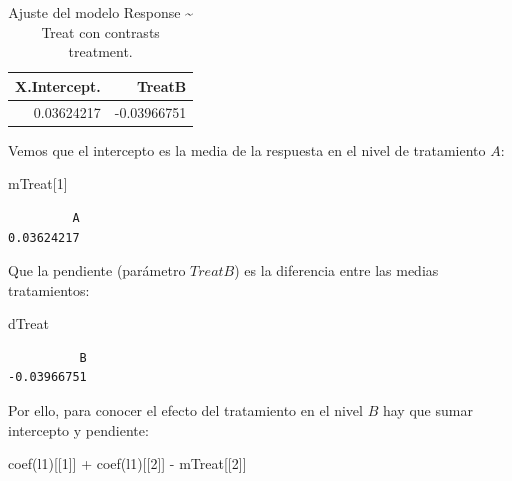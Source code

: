 \documentclass[
  12pt,
  a4paper,
  extrafontsizes,
  onecolumn,
  openright]{memoir}
\newenvironment{Shaded}{\begin{snugshade}}{\end{snugshade}}
\newcommand{\DecValTok}[1]{\textcolor[rgb]{0.68,0.00,0.00}{#1}}
\newcommand{\FunctionTok}[1]{\textcolor[rgb]{0.28,0.35,0.67}{#1}}
\newcommand{\NormalTok}[1]{\textcolor[rgb]{0.00,0.23,0.31}{#1}}
\newcommand{\SpecialCharTok}[1]{\textcolor[rgb]{0.37,0.37,0.37}{#1}}
\begin{document}
\hypertarget{tbl-l1}{}
\begin{longtable}{rr}
\caption{\label{tbl-l1}Ajuste del modelo Response \textasciitilde{} Treat con contrasts
treatment. }\tabularnewline

\toprule
X.Intercept. & TreatB \\ 
\midrule
0.03624217 & -0.03966751 \\ 
\bottomrule
\end{longtable}

\normalsize

Vemos que el intercepto es la media de la respuesta en el nivel de
tratamiento \(A\):

\scriptsize

\begin{Shaded}
\begin{Highlighting}[]
\NormalTok{mTreat[}\DecValTok{1}\NormalTok{]}
\end{Highlighting}
\end{Shaded}

\begin{verbatim}
         A 
0.03624217 
\end{verbatim}

\normalsize

Que la pendiente (parámetro \(TreatB\)) es la diferencia entre las
medias tratamientos:

\scriptsize

\begin{Shaded}
\begin{Highlighting}[]
\NormalTok{dTreat}
\end{Highlighting}
\end{Shaded}

\begin{verbatim}
          B 
-0.03966751 
\end{verbatim}

\normalsize

Por ello, para conocer el efecto del tratamiento en el nivel \(B\) hay
que sumar intercepto y pendiente:

\scriptsize

\begin{Shaded}
\begin{Highlighting}[]
\FunctionTok{coef}\NormalTok{(l1)[[}\DecValTok{1}\NormalTok{]] }\SpecialCharTok{+} \FunctionTok{coef}\NormalTok{(l1)[[}\DecValTok{2}\NormalTok{]] }\SpecialCharTok{{-}}\NormalTok{ mTreat[[}\DecValTok{2}\NormalTok{]]}
\end{Highlighting}
\end{Shaded}
\end{document}
